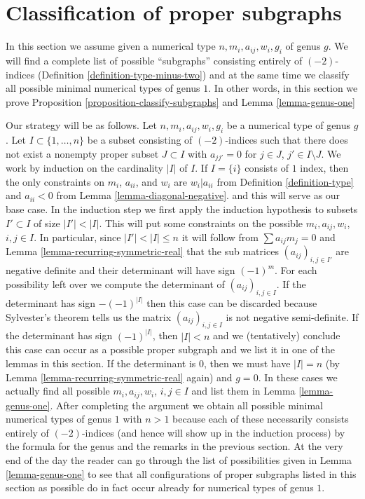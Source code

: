 \section{Classification of proper subgraphs}
\label{section-classify-proper-subgraphs}

\noindent
In this section we assume given a numerical type
$n, m_i, a_{ij}, w_i, g_i$ of genus $g$. We will find
a complete list of possible ``subgraphs'' consisting entirely
of $(-2)$-indices (Definition \ref{definition-type-minus-two}) and
at the same time we classify all possible minimal numerical
types of genus $1$. In other words, in this section we prove
Proposition \ref{proposition-classify-subgraphs} and
Lemma \ref{lemma-genus-one}

\medskip\noindent
Our strategy will be as follows. Let $n, m_i, a_{ij}, w_i, g_i$
be a numerical type of genus $g$. Let $I \subset \{1, \ldots, n\}$ be a subset
consisting of $(-2)$-indices such that there does not exist a nonempty proper
subset $J \subset I$ with $a_{jj'} = 0$ for $j \in J$, $j' \in I \setminus J$.
We work by induction on the cardinality $|I|$ of $I$. If $I = \{i\}$
consists of $1$ index, then the only constraints on $m_i$, $a_{ii}$,
and $w_i$ are $w_i | a_{ii}$ from Definition \ref{definition-type}
and $a_{ii} < 0$ from Lemma \ref{lemma-diagonal-negative}.
and this will serve as our base case. In the induction step
we first apply the induction hypothesis to subsets $I' \subset I$
of size $|I'| < |I|$. This will put some constraints on the possible
$m_i, a_{ij}, w_i$, $i, j \in I$. In particular, since $|I'| < |I| \leq n$
it will follow from $\sum a_{ij}m_j = 0$ and
Lemma \ref{lemma-recurring-symmetric-real} that the
sub matrices $(a_{ij})_{i, j \in I'}$ are negative definite
and their determinant will have sign $(-1)^m$.
For each possibility left over we compute the determinant of
$(a_{ij})_{i, j \in I}$. If the determinant has sign $-(-1)^{|I|}$
then this case can be discarded because Sylvester's theorem tells
us the matrix $(a_{ij})_{i, j \in I}$ is not negative semi-definite.
If the determinant has sign $(-1)^{|I|}$, then $|I| < n$ and we
(tentatively) conclude this case can occur as a possible proper subgraph
and we list it in one of the lemmas in this section.
If the determinant is $0$, then we must have $|I| = n$
(by Lemma \ref{lemma-recurring-symmetric-real} again) and $g = 0$.
In these cases we actually find all possible $m_i, a_{ij}, w_i$, $i, j \in I$
and list them in Lemma \ref{lemma-genus-one}. After completing the
argument we obtain all possible minimal numerical types of genus
$1$ with $n > 1$ because each of these necessarily consists entirely
of $(-2)$-indices (and hence will show up in the induction process)
by the formula for the genus and the remarks in the previous section.
At the very end of the day the reader can go through the list of
possibilities given in Lemma \ref{lemma-genus-one} to see that all
configurations of proper subgraphs listed in this section as possible
do in fact occur already for numerical types of genus $1$.

